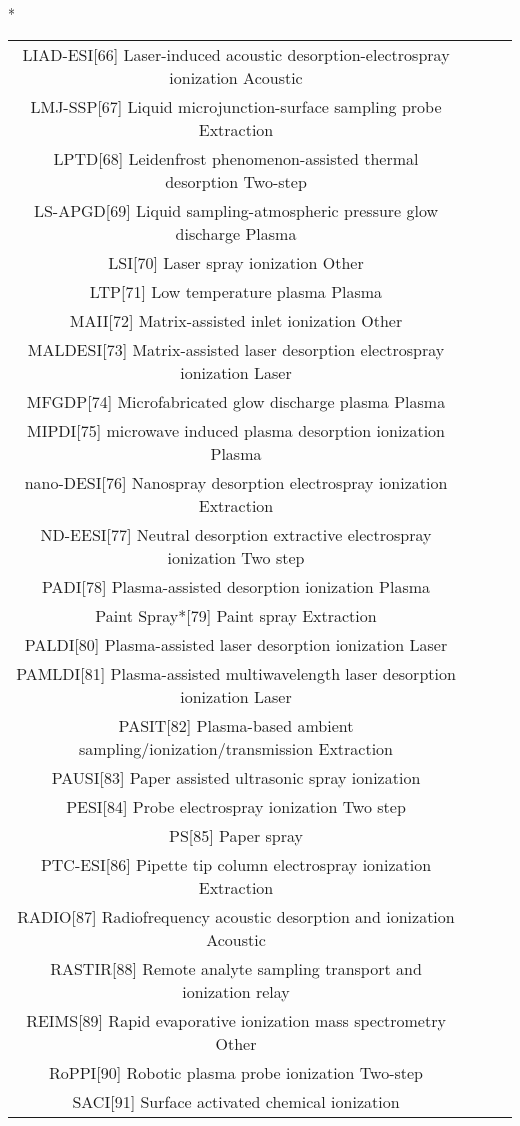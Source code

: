 \begin{table}{*}
\begin{tabular}{|c|c|c|l|}
LIAD-ESI[66] Laser-induced acoustic desorption-electrospray ionization Acoustic \\
LMJ-SSP[67] Liquid microjunction-surface sampling probe Extraction \\
LPTD[68] Leidenfrost phenomenon-assisted thermal desorption Two-step \\
LS-APGD[69] Liquid sampling-atmospheric pressure glow discharge Plasma \\
LSI[70] Laser spray ionization Other \\
LTP[71] Low temperature plasma Plasma \\
MAII[72] Matrix-assisted inlet ionization Other \\
MALDESI[73] Matrix-assisted laser desorption electrospray ionization Laser \\
MFGDP[74] Microfabricated glow discharge plasma Plasma \\
MIPDI[75] microwave induced plasma desorption ionization Plasma \\
nano-DESI[76] Nanospray desorption electrospray ionization Extraction \\
ND-EESI[77] Neutral desorption extractive electrospray ionization Two step \\
PADI[78] Plasma-assisted desorption ionization Plasma \\
Paint Spray*[79] Paint spray Extraction \\
PALDI[80] Plasma-assisted laser desorption ionization Laser \\
PAMLDI[81] Plasma-assisted multiwavelength laser desorption ionization Laser \\
PASIT[82] Plasma-based ambient sampling/ionization/transmission Extraction \\
PAUSI[83] Paper assisted ultrasonic spray ionization  \\
PESI[84] Probe electrospray ionization Two step \\
PS[85] Paper spray  \\
PTC-ESI[86] Pipette tip column electrospray ionization Extraction \\
RADIO[87] Radiofrequency acoustic desorption and ionization Acoustic \\
RASTIR[88] Remote analyte sampling transport and ionization relay \\ 
REIMS[89] Rapid evaporative ionization mass spectrometry Other \\
RoPPI[90] Robotic plasma probe ionization Two-step \\
SACI[91] Surface activated chemical ionization  \\

\end{tabular}
\end{table}
